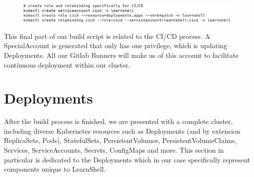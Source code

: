 \documentclass[thesis=B,english]{FITthesis}[2019/12/23]
\begin{document}
\begin{figure}[H]
\centering
\hspace*{-0.5cm}
\includegraphics[scale=0.5]{build-kube3}
\end{figure}

This final part of our build script is related to the CI/CD process. A SpecialAccount is generated that only has one privilege, which is updating Deployments. All our Gitlab Runners will make us of this account to facilitate continuous deployment within our cluster.

\section{Deployments}

After the build process is finished, we are presented with a complete cluster, including diverse Kubernetes resources such as Deployments (and by extension ReplicaSets, Pods), StatefulSets, PersistentVolumes, PersistentVolumeClaims, Services, ServiceAccounts, Secrets, ConfigMaps and more. This section in particular is dedicated to the Deployments which in our case specifically represent components unique to LearnShell.
\end{document}
